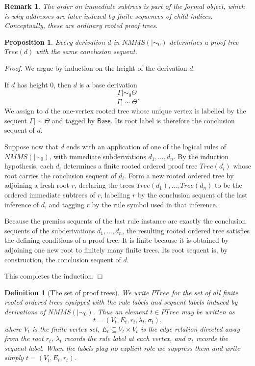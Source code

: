 \documentclass[11pt]{article}
\newtheorem{proposition}[theorem]{Proposition}
\newtheorem{definition}[theorem]{Definition}
\newtheorem{remark}[theorem]{Remark}
\newcommand{\ms}{\mathrel{\mid\!\sim}}
\newcommand{\mszero}{\mathrel{\mid\!\sim_{0}}}
\newcommand{\NMMS}{\mathit{NMMS}}
\newcommand{\PTree}{\mathit{PTree}}
\newcommand{\Tree}{\mathit{Tree}}
\begin{document}
\begin{remark}
The order on immediate subtrees is part of the formal object, which is why
addresses are later indexed by finite sequences of child indices.
Conceptually, these are ordinary rooted proof trees.
\end{remark}

\begin{proposition}
Every derivation \(d\) in \(\NMMS(\mszero)\) determines a proof tree
\(\Tree(d)\) with the same conclusion sequent.
\end{proposition}

\begin{proof}
We argue by induction on the height of the derivation \(d\).

If \(d\) has height \(0\), then \(d\) is a base derivation
\[
\frac{\Gamma \mszero \Theta}{\Gamma \ms \Theta}.
\]
We assign to \(d\) the one-vertex rooted tree whose unique vertex is labelled
by the sequent \(\Gamma \ms \Theta\) and tagged by \(\mathsf{Base}\). Its root
label is therefore the conclusion sequent of \(d\).

Suppose now that \(d\) ends with an application of one of the logical rules of
\(\NMMS(\mszero)\), with immediate subderivations \(d_1,\dots,d_n\). By the
induction hypothesis, each \(d_i\) determines a finite rooted ordered proof
tree \(\Tree(d_i)\) whose root carries the conclusion sequent of \(d_i\). Form
a new rooted ordered tree by adjoining a fresh root \(r\), declaring the trees
\(\Tree(d_1),\dots,\Tree(d_n)\) to be the ordered immediate subtrees of \(r\),
labelling \(r\) by the conclusion sequent of the last inference of \(d\), and
tagging \(r\) by the rule symbol used in that inference.

Because the premiss sequents of the last rule instance are exactly the
conclusion sequents of the subderivations \(d_1,\dots,d_n\), the resulting
rooted ordered tree satisfies the defining conditions of a proof tree. It is
finite because it is obtained by adjoining one new root to finitely many finite
trees. Its root sequent is, by construction, the conclusion sequent of \(d\).

This completes the induction.
\end{proof}

\begin{definition}[The set of proof trees]
We write \(\PTree\) for the set of all finite rooted ordered trees equipped
with the rule labels and sequent labels induced by derivations of
\(\NMMS(\mszero)\). Thus an element \(t\in\PTree\) may be written as
\[
t=(V_t,E_t,r_t,\lambda_t,\sigma_t),
\]
where \(V_t\) is the finite vertex set, \(E_t\subseteq V_t\times V_t\) is the
edge relation directed away from the root \(r_t\), \(\lambda_t\) records the
rule label at each vertex, and \(\sigma_t\) records the sequent label. When
the labels play no explicit role we suppress them and write simply
\(t=(V_t,E_t,r_t)\).
\end{definition}
\end{document}
